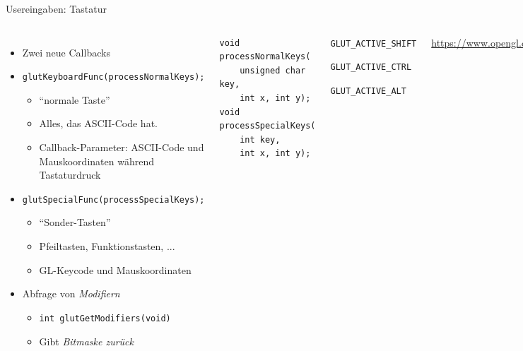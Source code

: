 \begin{frame}[fragile]{Usereingaben: Tastatur}
%
\begin{columns}[T]
\begin{itemize}
\item Zwei neue Callbacks
\item \texttt{glutKeyboardFunc(processNormalKeys);}
	\begin{itemize}
	\item \enquote{normale Taste}
	\item Alles, das ASCII-Code hat.
	\item Callback-Parameter: ASCII-Code und Mauskoordinaten während Tastaturdruck
	\end{itemize}
\item \texttt{glutSpecialFunc(processSpecialKeys);}
	\begin{itemize}
	\item \enquote{Sonder-Tasten}
	\item Pfeiltasten, Funktionstasten, ...
	\item GL-Keycode und Mauskoordinaten
	\end{itemize}
\item Abfrage von \emph{Modifiern}
	\begin{itemize}
	\item \texttt{int glutGetModifiers(void)}
	\item Gibt \emph{Bitmaske zurück}
	\end{itemize}
\end{itemize}
%
\vspace{-10pt}
\begin{codebox}
\begin{verbatim}
void processNormalKeys(
    unsigned char key, 
    int x, int y);
void processSpecialKeys(
    int key, 
    int x, int y);
\end{verbatim}
\end{codebox}
%
\begin{itembox}
\footnotesize
	\item \texttt{GLUT\_ACTIVE\_SHIFT}
	\item \texttt{GLUT\_ACTIVE\_CTRL}
	\item \texttt{GLUT\_ACTIVE\_ALT}
\end{itembox}
{\tiny\url{https://www.opengl.org/resources/libraries/glut/spec3/node73.html}}
\end{columns}
%
\end{frame}

